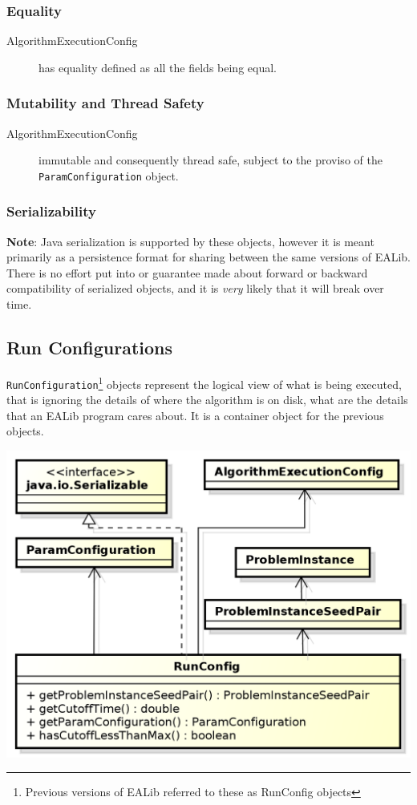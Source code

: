 \documentclass[11pt,letterpaper,oneside]{article}
\begin{document}
\subsubsection{Equality}
\begin{description}
\item[AlgorithmExecutionConfig] has equality defined as all the fields being equal.
\end{description}

\subsubsection{Mutability and Thread Safety}
\begin{description}
\item[AlgorithmExecutionConfig] immutable and consequently thread safe, subject to the proviso of the \texttt{ParamConfiguration} object.
\end{description}

\subsubsection{Serializability}

\textbf{Note}: Java serialization is supported by these objects, however it is meant primarily as a persistence format for sharing between the same versions of EALib. There is no effort put into or guarantee made about forward or backward compatibility of serialized objects, and it is \emph{very} likely that it will break over time.

\subsection{Run Configurations}

\texttt{RunConfiguration}\footnote{Previous versions of EALib referred to these as RunConfig objects} objects represent the logical view of what is being executed, that is ignoring the details of where the algorithm is on disk, what are the details that an EALib program cares about. It is a container object for the previous objects.

\begin{center}
\includegraphics[scale=0.75]{img/UML/RunConfig_2.png}
\end{center}
\end{document}
